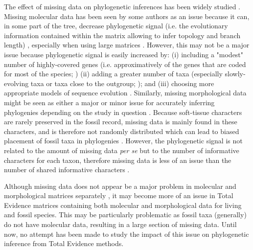 \documentclass[12pt,letterpaper]{article}
\begin{document}
The effect of missing data on phylogenetic inferences has been widely studied \citep{wiensmissing2003,wiensmissing2006,wiensmissing2008,lemmonthe2009,rouresite-specific2011,sansomfossilization2013}.
Missing molecular data has been seen by some authors as an issue because it can, in some part of the tree, decrease phylogenetic signal (i.e. the evolutionary information contained within the matrix allowing to infer topology and branch length)%
    , especially when using large matrices \citep{lemmonthe2009}.
However, this may not be a major issue because phylogenetic signal is easily increased by:
(i) including a "modest" number of highly-covered genes (i.e. approximatively of the genes that are coded for most of the species; \citealt{rouresite-specific2011}) %
(ii) adding a greater number of taxa (especially slowly-evolving taxa or taxa close to the outgroup; \citealt{rouresite-specific2011}); and
(iii) choosing more appropriate models of sequence evolution \citep{wiensmissing2006,wiensmissing2008,rouresite-specific2011}.
Similarly, missing morphological data might be seen as either a major or minor issue for accurately inferring phylogenies depending on the study in question \citep{wiensmissing2003,sansomfossilization2013}.
Because soft-tissue characters are rarely preserved in the fossil record, missing data is mainly found in these characters, and is therefore not randomly distributed which can lead to biased placement of fossil taxa in phylogenies \citep{sansomfossilization2013}.
However, the phylogenetic signal is not related to the amount of missing data \textit{per se} but to the number of informative characters for each taxon, therefore missing data is less of an issue than the number of shared informative characters \citep{wiensmissing2003}.

Although missing data does not appear be a major problem in molecular and morphological matrices separately \citep{wiensmissing2003,wiensmissing2006,wiensmissing2008,rouresite-specific2011}, it may become more of an issue in Total Evidence matrices containing both molecular and morphological data for living and fossil species.
This may be particularly problematic as fossil taxa (generally) do not have molecular data, resulting in a large section of missing data.
Until now, no attempt has been made to study the impact of this issue on phylogenetic inference from Total Evidence methods. 
\end{document}
